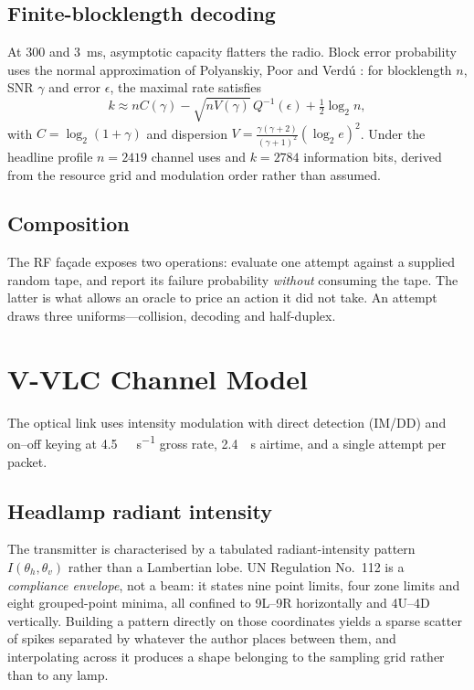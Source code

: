 \documentclass[conference]{IEEEtran}
\begin{document}
\subsection{Finite-blocklength decoding}

At \SI{300}{\byte} and \SI{3}{\milli\second}, asymptotic capacity flatters the
radio. Block error probability uses the normal approximation of Polyanskiy,
Poor and Verd\'u \cite{ppv2010}: for blocklength $n$, SNR $\gamma$ and error
$\epsilon$, the maximal rate satisfies
\begin{equation}
k \approx nC(\gamma) - \sqrt{nV(\gamma)}\,Q^{-1}(\epsilon)
+ \tfrac{1}{2}\log_2 n,
\end{equation}
with $C=\log_2(1+\gamma)$ and dispersion
$V=\frac{\gamma(\gamma+2)}{(\gamma+1)^{2}}(\log_2 e)^{2}$. Under the headline
profile $n=\num{2419}$ channel uses and $k=\num{2784}$ information bits,
derived from the resource grid and modulation order rather than assumed.

\subsection{Composition}

The RF fa\c{c}ade exposes two operations: evaluate one attempt against a
supplied random tape, and report its failure probability \emph{without}
consuming the tape. The latter is what allows an oracle to price an action it
did not take. An attempt draws three uniforms---collision, decoding and
half-duplex.

\section{V-VLC Channel Model}
\label{sec:vlc}

The optical link uses intensity modulation with direct detection (IM/DD) and
on--off keying at \SI{4.5}{\mega\bit\per\second} gross rate, \SI{2.4}{\milli
\second} airtime, and a single attempt per packet.

\subsection{Headlamp radiant intensity}

The transmitter is characterised by a tabulated radiant-intensity pattern
$I(\theta_h,\theta_v)$ rather than a Lambertian lobe. UN Regulation No.~112 is
a \emph{compliance envelope}, not a beam: it states nine point limits, four
zone limits and eight grouped-point minima, all confined to 9L--9R
horizontally and 4U--4D vertically. Building a pattern directly on those
coordinates yields a sparse scatter of spikes separated by whatever the author
places between them, and interpolating across it produces a shape belonging to
the sampling grid rather than to any lamp.
\end{document}
